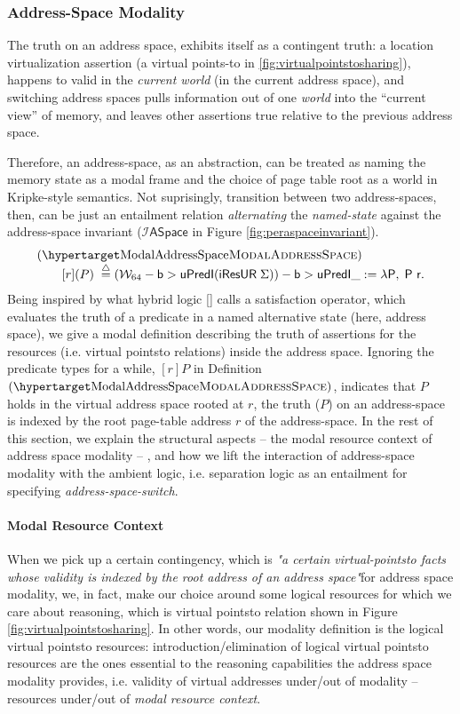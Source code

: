 \subsubsection{Address-Space Modality}
\label{sec:aspacemodalist}
The truth on an address space, exhibits itself as a contingent truth: a location virtualization assertion (a virtual points-to in \ref{fig:virtualpointstosharing}),  happens to valid in the \textit{current world} (in the current address space), and switching address spaces pulls information out of one \textit{world} into the “current view” of memory, and leaves other assertions true relative to the previous address space.

Therefore, an address-space, as an abstraction, can be treated as naming the memory state as a modal frame and the choice of page table root as a world in Kripke-style semantics. Not suprisingly, transition between two address-spaces, then, can be just an entailment relation \textit{alternating} the \textit{named-state} against the address-space invariant ($\mathcal{I}\textsf{ASpace}$ in Figure \ref{fig:peraspaceinvariant}). 
\[
  \begin{array}{l}
    \hbox{(\TirNameStyle{ModalAddressSpace})} \\ \qquad
         [r](P)  \;\stackrel{\triangle}{=}  (\mathcal{W}_{64} -\textsf{b}> \textsf{uPredI} (\textsf{iResUR} \;\Sigma)) -\textsf{b}> \textsf{uPredI} \_ := \lambda \textsf{P},\; \textsf{P r}. 
  \end{array}
\]
Being inspired by what hybrid logic \ref{} calls a satisfaction operator, which evaluates the truth of a predicate in a named alternative state (here, address space), we give a modal definition describing the truth of assertions for the resources (i.e. virtual pointsto relations) inside the address space. Ignoring the predicate types for a while, $[r]P$ in Definition $\hbox{(\TirNameStyle{ModalAddressSpace})}$, indicates that $P$ holds in the virtual address space rooted at $r$, the truth ($P$) on an address-space is indexed by the root page-table address $r$ of the address-space. In the rest of this section, we explain the structural aspects -- the modal resource context of address space modality -- , and how we lift the interaction of address-space modality with the ambient logic, i.e. separation logic as an entailment for specifying \textit{address-space-switch}.  
\paragraph{Modal Resource Context}
\label{sec:resourcecontext}
When we pick up a certain contingency, which is \textit{"a certain virtual-pointsto facts whose validity is indexed by the root address of an address space"}for address space modality, we, in fact, make our choice around some logical resources for which we care about reasoning, which is virtual pointsto relation shown in Figure \ref{fig:virtualpointstosharing}. In other words, our modality definition is the logical virtual pointsto resources: introduction/elimination of logical virtual pointsto resources are the ones essential to the reasoning capabilities the address space modality provides, i.e. validity of virtual addresses under/out of modality -- resources under/out of \textit{modal resource context}.

